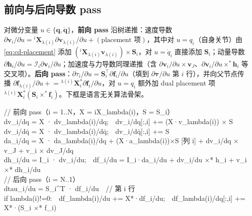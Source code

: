 \subsection{前向与后向导数 pass}
对微分变量 $u\in\{\mathbf q,\dot{\mathbf q}\}$，\textbf{前向 pass} 沿树递推：速度导数 $\partial\mathbf v_i/\partial u={}^i\mathbf X_{\lambda(i)}\partial\mathbf v_{\lambda(i)}/\partial u+(\text{placement 项})$，其中对 $u=q_i$（自身关节）由 \cref{eq:cd-placement} 添加 $({}^i\mathbf X_{\lambda(i)}\mathbf v_{\lambda(i)})\times\mathbf S_i$，对 $u=\dot q_i$ 直接添加 $\mathbf S_i$；动量导数 $\partial\mathbf h_i/\partial u=\mathcal I_i\partial\mathbf v_i/\partial u$；加速度与力导数同理递推（含 $\partial\mathbf v_i/\partial u\times\mathbf v_J$、$\partial\mathbf v_i/\partial u\times^*\mathbf h_i$ 等交叉项）。\textbf{后向 pass}：$\partial\tau_i/\partial u=\mathbf S_i^\top\partial\mathbf f_i/\partial u$（填到 $\partial\boldsymbol\tau/\partial u$ 第 $i$ 行），并向父节点传播 $\partial\mathbf f_{\lambda(i)}/\partial u\mathrel{+}={}^{\lambda(i)}\mathbf X_i^*\partial\mathbf f_i/\partial u$，对 $u=q_i$ 额外加 dual placement 项 ${}^{\lambda(i)}\mathbf X_i^*(\mathbf S_i\times^*\mathbf f_i)$。下框是语言无关算法骨架。

\begin{algo}\label{alg:cd-drnea}
\begin{flushleft}\small\ttfamily
// 前向 pass（i = 1..N，X = iX\_lambda(i)，S = S\_i）\\
\quad dv\_i/dq = X · dv\_lambda(i)/dq;\ \ dv\_i/dq[:,i] += (X·v\_lambda(i)) × S\\
\quad dv\_i/dq̇ = X · dv\_lambda(i)/dq̇;\ \ dv\_i/dq̇[:,i] += S\\
\quad da\_i/dq = X · da\_lambda(i)/dq + (X·a\_lambda(i))×S [列 i] + dv\_i/dq × v\_J + v\_i × dv\_J/dq\\
\quad dh\_i/du = I\_i · dv\_i/du;\ \ df\_i/du = I\_i·da\_i/du + dv\_i/du ×* h\_i + v\_i ×* dh\_i/du\\
// 后向 pass（i = N..1）\\
\quad dtau\_i/du = S\_i\textasciicircum T · df\_i/du\ \ // 第 i 行\\
\quad if lambda(i)!=0:\ \ df\_lambda(i)/du += X*·df\_i/du;\ \ df\_lambda(i)/dq[:,i] += X*·(S\_i ×* f\_i)
\end{flushleft}
\end{algo}

